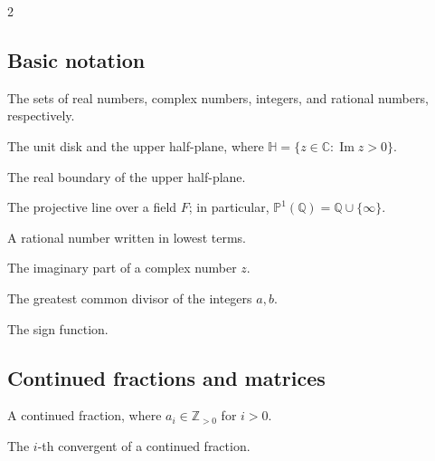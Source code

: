 \documentclass[10pt, a4paper]{article}
\theoremstyle{definition}
\theoremstyle{remark}
\begin{document}
\begingroup
\small
\setlength{\columnsep}{2em}
\begin{multicols}{2}

\subsection*{Basic notation}
\begin{description}[leftmargin=2.8cm, labelwidth=2.5cm, style=nextline]

\item[\(\mathbb R,\mathbb C,\mathbb Z,\mathbb Q\)]
The sets of real numbers, complex numbers, integers, and rational numbers, respectively.

\item[\(\mathbb D,\mathbb H\)]
The unit disk and the upper half-plane, where
\(\mathbb H=\{z\in\mathbb C:\operatorname{Im}z>0\}\).

\item[\(\partial\mathbb H\)]
The real boundary of the upper half-plane.

\item[\(\mathbb P^1(F)\)]
The projective line over a field \(F\); in particular,
\(\mathbb P^1(\mathbb Q)=\mathbb Q\cup\{\infty\}\).

\item[\(a/b\)]
A rational number written in lowest terms.

\item[\(\operatorname{Im}(z)\)]
The imaginary part of a complex number \(z\).

\item[\(\gcd(a,b)\)]
The greatest common divisor of the integers \(a,b\).

\item[\(\operatorname{sgn}(x)\)]
The sign function.

\end{description}

\subsection*{Continued fractions and matrices}
\begin{description}[leftmargin=2.8cm, labelwidth=2.5cm, style=nextline]

\item[{\([a_0;a_1,\ldots,a_n]\)}]
A continued fraction, where \(a_i\in\mathbb {Z}_{>0}\) for \(i>0\).

\item[\(x_i=p_i/q_i\)]
The \(i\)-th convergent of a continued fraction.


\end{description}
\end{multicols}
\end{document}
